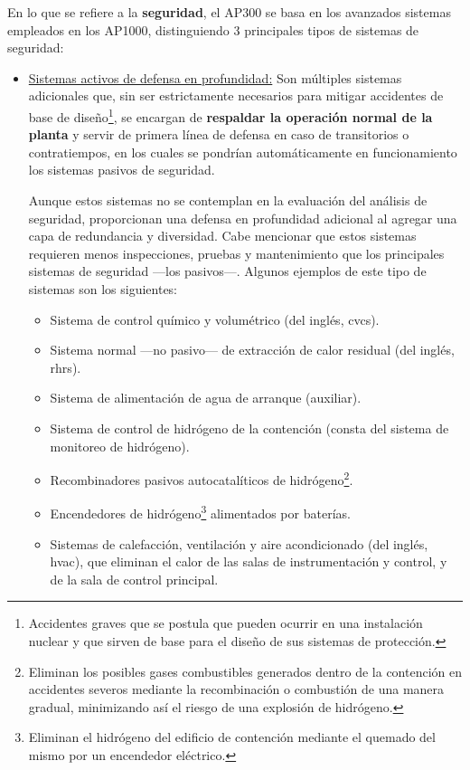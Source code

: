 En lo que se refiere a la \textbf{seguridad}, el AP300 se basa en los avanzados sistemas empleados en los AP1000, distinguiendo 3 principales tipos de sistemas de seguridad:

\begin{itemize}
  \item \underline{Sistemas activos de defensa en profundidad:} Son múltiples sistemas adicionales que, sin ser estrictamente necesarios para mitigar accidentes de base de diseño\footnote{Accidentes graves que se postula que pueden ocurrir en una instalación nuclear y que sirven de base para el diseño de sus sistemas de protección.}, se encargan de \textbf{respaldar la operación normal de la planta} y servir de primera línea de defensa en caso de transitorios o contratiempos, en los cuales se pondrían automáticamente en funcionamiento los sistemas pasivos de seguridad. 
  
  Aunque estos sistemas no se contemplan en la evaluación del análisis de seguridad, proporcionan una defensa en profundidad adicional al agregar una capa de redundancia y diversidad. Cabe mencionar que estos sistemas requieren menos inspecciones, pruebas y mantenimiento que los principales sistemas de seguridad ---los pasivos---. Algunos ejemplos de este tipo de sistemas son los siguientes:

  \begin{itemize}
    \item Sistema de control químico y volumétrico (del inglés, \acrshort{cvcs}).
    \item Sistema normal ---no pasivo--- de extracción de calor residual (del inglés, \acrshort{rhrs}).
    \item Sistema de alimentación de agua de arranque (auxiliar).
    \item Sistema de control de hidrógeno de la contención (consta del sistema de monitoreo de hidrógeno).
    \item R\gls{ecombinadores pasivos} autocatalíticos de hidrógeno\footnote{Eliminan los posibles gases combustibles generados dentro de la contención en accidentes severos mediante la recombinación o combustión de una manera gradual, minimizando así el riesgo de una explosión de hidrógeno.}.
    \item Encendedores de hidrógeno\footnote{Eliminan el hidrógeno del edificio de contención mediante el quemado del mismo por un encendedor eléctrico.} alimentados por baterías.
    \item Sistemas de calefacción, ventilación y aire acondicionado (del inglés, \acrshort{hvac}), que eliminan el calor de las salas de instrumentación y control, y de la sala de control principal.
  \end{itemize}


\end{itemize}
